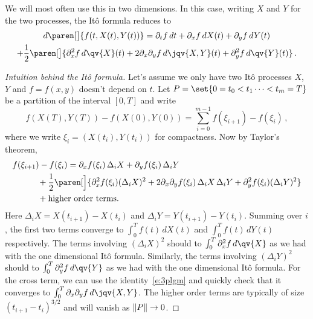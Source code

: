 \begin{remark}
  We will most often use this in two dimensions.
  In this case, writing $X$ and $Y$ for the two processes, the It\^o formula reduces to
  \begin{multline*}
    d\paren[\big]{f(t, X(t), Y(t))}
      = \partial_t f \, dt
	+ \partial_x f \, dX(t)
	+ \partial_y f \, dY(t)
    \\
	+ \frac{1}{2} \paren[\big]{
	    \partial_x^2 f \, d\qv{X}(t)
	    + 2 \partial_x \partial_y f \, d\jqv{X,Y}(t)
	    + \partial_y^2 f \, d\qv{Y}(t)
	}\,.
  \end{multline*}
\end{remark}

\begin{proof}[Intuition behind the It\^o formula]
  Let's assume we only have two It\^o processes $X$, $Y$ and $f = f(x, y)$ doesn't depend on $t$.
  Let $P = \set{0 = t_0 < t_1 \cdots < t_m = T}$ be a partition of the interval $[0, T]$ and write
  \begin{equation*}
    f(X(T), Y(T)) - f(X(0), Y(0))
      = \sum_{i=0}^{m-1}
	  f(\xi_{i+1})
	  - f(\xi_i)\,,
  \end{equation*}
  where we write $\xi_i = (X(t_i), Y(t_i))$ for compactness.
  Now by Taylor's theorem,
  \begin{align*}
    \MoveEqLeft
    f(\xi_{i+1}) - f(\xi_i)
      = \partial_x f(\xi_i) \, \Delta_i X
	+ \partial_y f(\xi_i) \, \Delta_i Y
    \\
      &\quad\mathbin+ \frac{1}{2} \paren[\Big]{
	    \partial_x^2 f(\xi_i) (\Delta_i X)^2
	    + 2 \partial_x \partial_y f(\xi_i) \, \Delta_i X \, \Delta_i Y
	    + \partial_y^2 f(\xi_i) (\Delta_i Y)^2
	}
    \\
      &\quad\mathbin + \text{higher order terms.}
  \end{align*}
  Here $\Delta_i X = X(t_{i+1}) - X(t_i)$ and $\Delta_i Y = Y(t_{i+1}) - Y(t_i)$.
  Summing over $i$, the first two terms converge to $\int_0^T f(t) \, dX(t)$ and $\int_0^T f(t) \, dY(t)$ respectively.
  The terms involving $(\Delta_i X)^2$ should to $\int_0^T \partial_x^2 f \, d\qv{X}$ as we had with the one dimensional It\^o formula.
  Similarly, the terms involving $(\Delta_i Y)^2$ should to $\int_0^T \partial_y^2 f \, d\qv{Y}$ as we had with the one dimensional It\^o formula.
  For the cross term, we can use the identity~\eqref{e:3plgm} and quickly check that it converges to $\int_0^T \partial_x \partial_y f \, d\jqv{X, Y}$.
  The higher order terms are typically of size $(t_{i+1} - t_i)^{3/2}$ and will vanish as $\lVert P\rVert \to 0$.
\end{proof}

